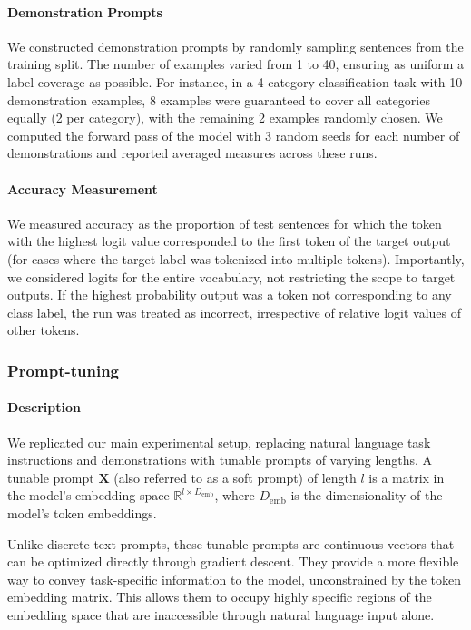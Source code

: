 \paragraph{Demonstration Prompts}
We constructed demonstration prompts by randomly sampling sentences from the training split. The number of examples varied from 1 to 40, ensuring as uniform a label coverage as possible. For instance, in a 4-category classification task with 10 demonstration examples, 8 examples were guaranteed to cover all categories equally (2 per category), with the remaining 2 examples randomly chosen. We computed the forward pass of the model with 3 random seeds for each number of demonstrations and reported averaged measures across these runs.

\paragraph{Accuracy Measurement}
We measured accuracy as the proportion of test sentences for which the token with the highest logit value corresponded to the first token of the target output (for cases where the target label was tokenized into multiple tokens). Importantly, we considered logits for the entire vocabulary, not restricting the scope to target outputs. If the highest probability output was a token not corresponding to any class label, the run was treated as incorrect, irrespective of relative logit values of other tokens.

\subsubsection{Prompt-tuning}

\paragraph{Description}
We replicated our main experimental setup, replacing natural language task instructions and demonstrations with tunable prompts of varying lengths. A tunable prompt $\mathbf{X}$ (also referred to as a soft prompt) of length $l$ is a matrix in the model's embedding space $\mathbb{R}^{l \times D_\text{emb}}$, where $D_\text{emb}$ is the dimensionality of the model's token embeddings.

Unlike discrete text prompts, these tunable prompts are continuous vectors that can be optimized directly through gradient descent. They provide a more flexible way to convey task-specific information to the model, unconstrained by the token embedding matrix. This allows them to occupy highly specific regions of the embedding space that are inaccessible through natural language input alone.

